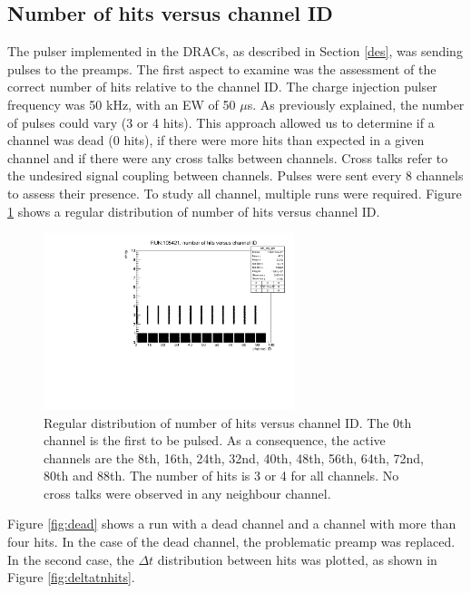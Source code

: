 \subsection{Number of hits versus channel ID}\label{nhitvschid}
The pulser implemented in the DRACs, as described in Section \ref{des}, was sending pulses to the preamps. 
The first aspect to examine was the assessment of the correct number of hits relative to the channel ID.
The charge injection pulser frequency was 50 kHz, with an EW of 50 $\mu$s. As previously explained, 
the number of pulses could vary (3 or 4 hits). This approach allowed us to determine if a channel was dead (0 hits), 
if there were more hits than expected in a given channel and if there were any cross talks between channels. 
Cross talks refer to the undesired signal coupling between channels. 
Pulses were sent every 8 channels to assess their presence. To study all channel, multiple runs were required.
Figure \ref{fig:normalhits} shows a regular distribution of number of hits versus channel ID.
\begin{figure}[!h]
      \centering
      \includegraphics[width=0.65\textwidth]{figures/pdf/run105421_nh_vs_ch.pdf}
      \caption{Regular distribution of number of hits versus channel ID. The 0th channel is the first to be pulsed.
      As a consequence, the active channels are the 8th, 16th, 24th, 32nd, 40th, 48th, 56th, 64th, 72nd, 80th and 88th. The number of hits is 3 or 4 for all channels. 
      No cross talks were observed in any neighbour channel.}
     \label{fig:normalhits}
\end{figure}
Figure \ref{fig:dead} shows a run with a dead channel and a channel with more than four hits. 
In the case of the dead channel, the problematic preamp was replaced. In the second case, the 
$\Delta t$ distribution between hits was plotted, as shown in Figure \ref{fig:deltatnhits}.

